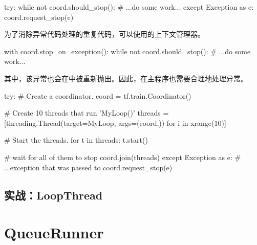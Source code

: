 \begin{content}
\begin{leftbar}
\begin{python}
try:
  while not coord.should_stop():
    # ...do some work...
except Exception as e:
  coord.request_stop(e)
\end{python}
\end{leftbar}

为了消除异常代码处理的重复代码，可以使用的上下文管理器。

\begin{leftbar}
\begin{python}
with coord.stop_on_exception():
  while not coord.should_stop():
    # ...do some work...
\end{python}
\end{leftbar}

其中，该异常也会在中被重新抛出。因此，在主程序也需要合理地处理异常。

\begin{leftbar}
\begin{python}
try:
  # Create a coordinator.
  coord = tf.train.Coordinator()

  # Create 10 threads that run 'MyLoop()'
  threads = [threading.Thread(target=MyLoop, args=(coord,)) 
            for i in xrange(10)]

  # Start the threads.
  for t in threads:
    t.start()

  # wait for all of them to stop
  coord.join(threads)
except Exception as e:
  # ...exception that was passed to coord.request\_stop(e)
\end{python}
\end{leftbar}

\subsection{实战：LoopThread}

\end{content}

\section{QueueRunner}

